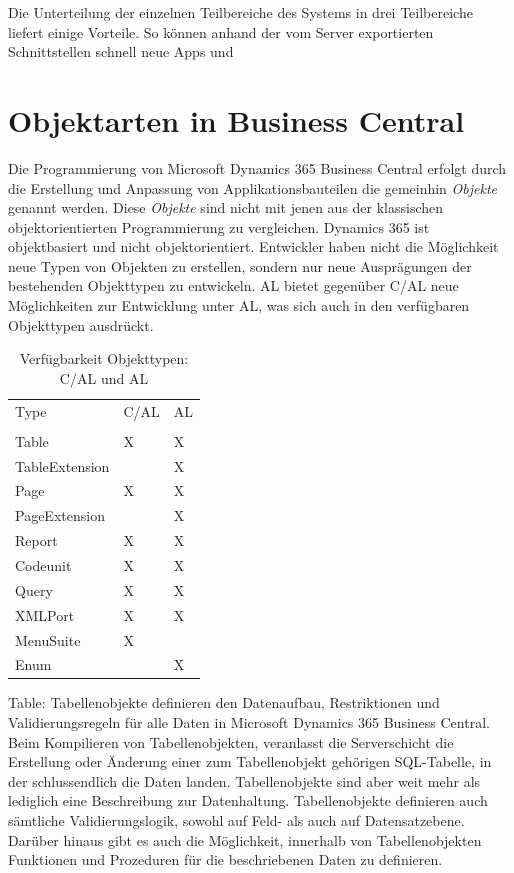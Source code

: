 Die Unterteilung der einzelnen Teilbereiche des Systems in drei Teilbereiche liefert einige Vorteile. So können anhand der vom Server exportierten Schnittstellen schnell neue Apps und 



\pagebreak
\section{Objektarten in Business Central}
\label{sec:Objektarten in Business Central}

Die Programmierung von Microsoft Dynamics 365 Business Central erfolgt durch die Erstellung und Anpassung von Applikationsbauteilen die gemeinhin \textit{Objekte} genannt werden. Diese \textit{Objekte} sind nicht mit jenen aus der klassischen objektorientierten Programmierung zu vergleichen. Dynamics 365 ist objektbasiert und nicht objektorientiert. Entwickler haben nicht die Möglichkeit neue Typen von Objekten zu erstellen, sondern nur neue Ausprägungen der bestehenden Objekttypen zu entwickeln. AL bietet gegenüber C/AL neue Möglichkeiten zur Entwicklung unter AL, was sich auch in den verfügbaren Objekttypen ausdrückt.

\begin{table}[htb]
	\centering
	\begin{tabular}{lll}
		Type           & C/AL & AL \\ 
		\\
		Table          & X    & X  \\
		TableExtension &      & X  \\
		Page           & X    & X  \\
		PageExtension  &      & X  \\
		Report         & X    & X  \\
		Codeunit       & X    & X  \\
		Query          & X    & X  \\
		XMLPort        & X    & X  \\
		MenuSuite      & X    &    \\
		Enum           &      & X  \\
	\end{tabular}
\caption{Verfügbarkeit Objekttypen: C/AL und AL}
\end{table}

Table: Tabellenobjekte definieren den Datenaufbau, Restriktionen und Validierungsregeln für alle Daten in Microsoft Dynamics 365 Business Central. Beim Kompilieren von Tabellenobjekten, veranlasst die Serverschicht die Erstellung oder Änderung einer zum Tabellenobjekt gehörigen SQL-Tabelle, in der schlussendlich die Daten landen. Tabellenobjekte sind aber weit mehr als lediglich eine Beschreibung zur Datenhaltung. Tabellenobjekte definieren auch sämtliche Validierungslogik, sowohl auf Feld- als auch auf Datensatzebene. Darüber hinaus gibt es auch die Möglichkeit, innerhalb von Tabellenobjekten Funktionen und Prozeduren für die beschriebenen Daten zu definieren.
\linebreak

